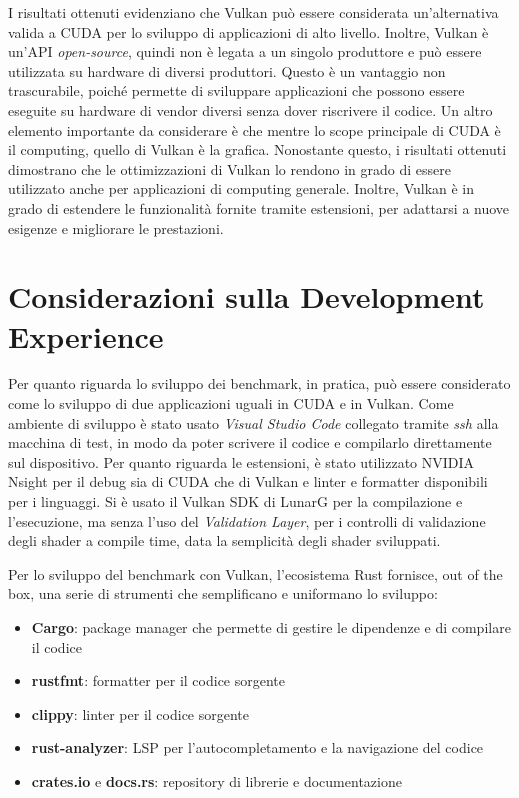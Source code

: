 I risultati ottenuti evidenziano che Vulkan può essere considerata un'alternativa valida a \gls{CUDA} per lo sviluppo di applicazioni di alto livello. Inoltre, Vulkan è un'\gls{API} \textit{open-source}, quindi non è legata a un singolo produttore e può essere utilizzata su hardware di diversi produttori. Questo è un vantaggio non trascurabile, poiché permette di sviluppare applicazioni che possono essere eseguite su hardware di vendor diversi senza dover riscrivere il codice. Un altro elemento importante da considerare è che mentre lo scope principale di \gls{CUDA} è il computing, quello di Vulkan è la grafica. Nonostante questo, i risultati ottenuti dimostrano che le ottimizzazioni di Vulkan lo rendono in grado di essere utilizzato anche per applicazioni di computing generale. Inoltre, Vulkan è in grado di estendere le funzionalità fornite tramite estensioni, per adattarsi a nuove esigenze e migliorare le prestazioni.

\section{Considerazioni sulla Development Experience}


Per quanto riguarda lo sviluppo dei benchmark, in pratica, può essere considerato come lo sviluppo di due applicazioni uguali in \gls{CUDA} e in Vulkan. Come ambiente di sviluppo è stato usato \textit{Visual Studio Code} collegato tramite \textit{ssh} alla macchina di test, in modo da poter scrivere il codice e compilarlo direttamente sul dispositivo. Per quanto riguarda le estensioni, è stato utilizzato NVIDIA Nsight \cite[]{NVIDIA:nsight} per il debug sia di \gls{CUDA} che di Vulkan e linter e formatter disponibili per i linguaggi. Si è usato il Vulkan SDK di LunarG \cite[]{KG:vulkan_sdk} per la compilazione e l'esecuzione, ma senza l'uso del \textit{Validation Layer}, per i controlli di validazione degli shader a compile time, data la semplicità degli shader sviluppati.


Per lo sviluppo del benchmark con Vulkan, l'ecosistema Rust fornisce, out of the box, una serie di strumenti che semplificano e uniformano lo sviluppo:

\begin{itemize}
    \item \textbf{Cargo}: package manager che permette di gestire le dipendenze e di compilare il codice
    \item \textbf{rustfmt}: formatter per il codice sorgente
    \item \textbf{clippy}: linter per il codice sorgente
    \item \textbf{rust-analyzer}: \gls{LSP} per l'autocompletamento e la navigazione del codice
    \item \textbf{crates.io} e \textbf{docs.rs}: repository di librerie e documentazione
\end{itemize}

